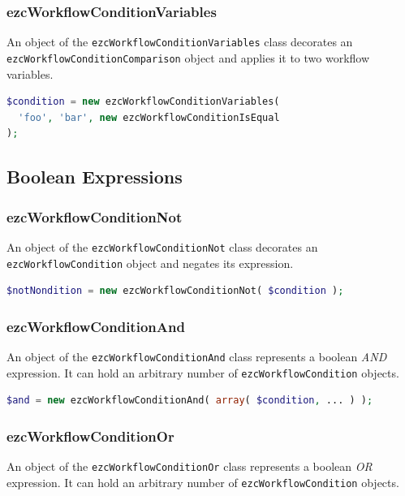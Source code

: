 \subsubsection{ezcWorkflowConditionVariables}

An object of the \texttt{ezcWorkflowConditionVariables} class decorates an\\
\texttt{ezcWorkflowConditionComparison} object and applies it to two workflow
variables.

\begin{lstlisting}[language=PHP]
$condition = new ezcWorkflowConditionVariables(
  'foo', 'bar', new ezcWorkflowConditionIsEqual
);
\end{lstlisting}

\subsection{Boolean Expressions}

\subsubsection{ezcWorkflowConditionNot}

An object of the \texttt{ezcWorkflowConditionNot} class decorates an
\texttt{ezcWorkflowCondition} object and negates its expression.

\begin{lstlisting}[language=PHP]
$notNondition = new ezcWorkflowConditionNot( $condition );
\end{lstlisting}

\subsubsection{ezcWorkflowConditionAnd}

An object of the \texttt{ezcWorkflowConditionAnd} class represents a
boolean \emph{AND} expression. It can hold an arbitrary number of
\texttt{ezcWorkflowCondition} objects.

\begin{lstlisting}[language=PHP]
$and = new ezcWorkflowConditionAnd( array( $condition, ... ) );
\end{lstlisting}

\subsubsection{ezcWorkflowConditionOr}

An object of the \texttt{ezcWorkflowConditionOr} class represents a
boolean \emph{OR} expression. It can hold an arbitrary number of
\texttt{ezcWorkflowCondition} objects.

